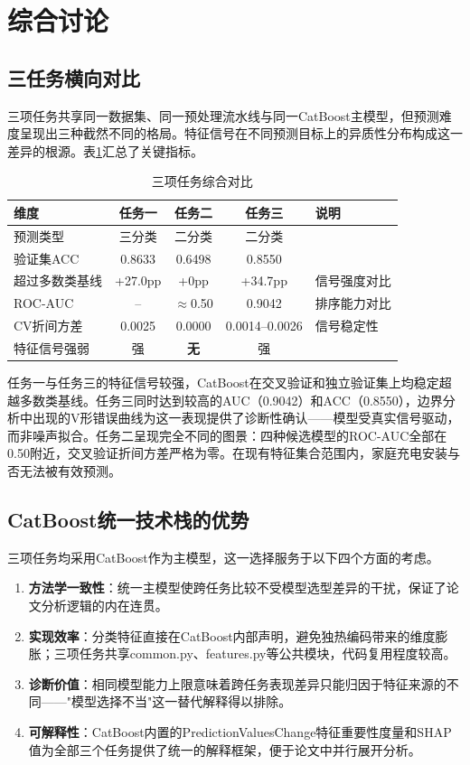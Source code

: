 \section{综合讨论}

\subsection{三任务横向对比}

三项任务共享同一数据集、同一预处理流水线与同一CatBoost主模型，但预测难度呈现出三种截然不同的格局。特征信号在不同预测目标上的异质性分布构成这一差异的根源。表\ref{tab:overall}汇总了关键指标。

\begin{table}[H]
\centering
\caption{三项任务综合对比}
\label{tab:overall}
\begin{tabular}{lcccl}
\toprule
\textbf{维度} & \textbf{任务一} & \textbf{任务二} & \textbf{任务三} & \textbf{说明} \\
\midrule
预测类型 & 三分类 & 二分类 & 二分类 & \\
验证集ACC & 0.8633 & 0.6498 & 0.8550 & \\
超过多数类基线 & +27.0pp & +0pp & +34.7pp & 信号强度对比 \\
ROC-AUC & -- & $\approx$0.50 & 0.9042 & 排序能力对比 \\
CV折间方差 & 0.0025 & 0.0000 & 0.0014--0.0026 & 信号稳定性 \\
特征信号强弱 & 强 & \textbf{无} & 强 & \\
\bottomrule
\end{tabular}
\end{table}

任务一与任务三的特征信号较强，CatBoost在交叉验证和独立验证集上均稳定超越多数类基线。任务三同时达到较高的AUC（0.9042）和ACC（0.8550），边界分析中出现的V形错误曲线为这一表现提供了诊断性确认——模型受真实信号驱动，而非噪声拟合。任务二呈现完全不同的图景：四种候选模型的ROC-AUC全部在0.50附近，交叉验证折间方差严格为零。在现有特征集合范围内，家庭充电安装与否无法被有效预测。

\subsection{CatBoost统一技术栈的优势}

三项任务均采用CatBoost作为主模型，这一选择服务于以下四个方面的考虑。

\begin{enumerate}[itemsep=0pt]
\item \textbf{方法学一致性}：统一主模型使跨任务比较不受模型选型差异的干扰，保证了论文分析逻辑的内在连贯。
\item \textbf{实现效率}：分类特征直接在CatBoost内部声明，避免独热编码带来的维度膨胀；三项任务共享common.py、features.py等公共模块，代码复用程度较高。
\item \textbf{诊断价值}：相同模型能力上限意味着跨任务表现差异只能归因于特征来源的不同——"模型选择不当"这一替代解释得以排除。
\item \textbf{可解释性}：CatBoost内置的PredictionValuesChange特征重要性度量和SHAP值为全部三个任务提供了统一的解释框架，便于论文中并行展开分析。
\end{enumerate}

